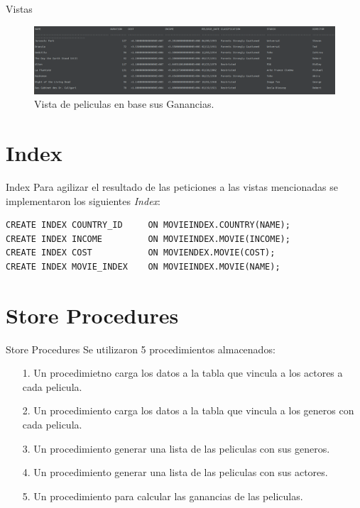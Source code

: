 \documentclass{beamer}%
\begin{document}
\begin{frame}{Vistas}
\begin{figure}
    \centering
  	\includegraphics[scale=0.15]{figures/screenshot_vista3.png}
  	  	\caption{Vista de peliculas en base sus Ganancias.} \label{vista3}
\end{figure}
\end{frame}

\section{Index}

\begin{frame}[fragile]{Index}
Para agilizar el resultado de las peticiones a las vistas mencionadas se implementaron los siguientes \textit{Index}:

\begin{verbatim}
CREATE INDEX COUNTRY_ID 	ON MOVIEINDEX.COUNTRY(NAME);
CREATE INDEX INCOME 		ON MOVIEINDEX.MOVIE(INCOME);
CREATE INDEX COST			ON MOVIENDEX.MOVIE(COST);
CREATE INDEX MOVIE_INDEX	ON MOVIEINDEX.MOVIE(NAME);
\end{verbatim}

\end{frame}

\section{Store Procedures}
	
\begin{frame}{Store Procedures}
Se utilizaron 5 procedimientos almacenados:
\begin{itemize}
\item[1.] Un procedimietno carga los datos a la tabla que vincula a los actores a cada pelicula.
\item[2.] Un procedimiento carga los datos a la tabla que vincula a los generos con cada pelicula.
\item[3.] Un procedimiento generar una lista de las peliculas con sus generos.
\item[4.] Un procedimiento generar una lista de las peliculas con sus actores.
\item[5.] Un procedimiento para calcular las ganancias de las peliculas.
\end{itemize}

\end{frame}
\end{document}
